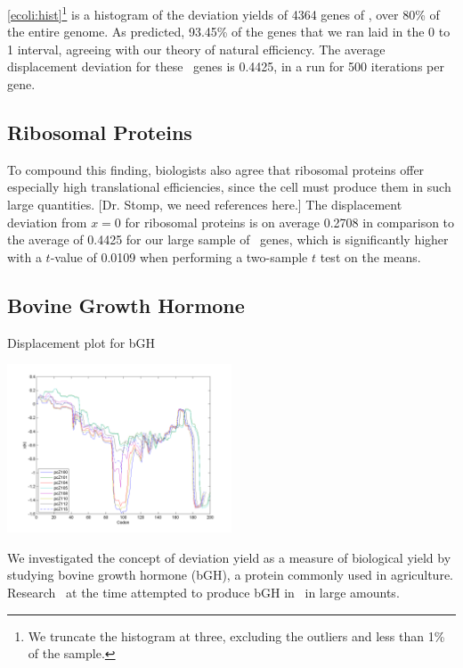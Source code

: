 \documentclass[12pt]{article}
\numberwithin{equation}{section}
\begin{document}
\autoref{ecoli:hist}\footnote{We truncate the histogram at three, excluding
  the outliers and less than 1\% of the sample.} is a histogram of the
deviation yields of 4364 genes of \ecoli, over 80\% of the entire
genome.  As predicted, 93.45\% of the genes that we ran laid in the 0
to 1 interval, agreeing with our theory of natural efficiency.  The
average displacement deviation for these \ecoli\ genes is 0.4425, in a
run for 500 iterations per gene.

\subsection{Ribosomal Proteins}
\label{section:riboproteins}
To compound this finding, biologists also agree that ribosomal
proteins offer especially high translational efficiencies, since the
cell must produce them in such large quantities. [Dr. Stomp, we need
  references here.] The displacement deviation from $x=0$ for ribosomal proteins
is on average 0.2708 in comparison to the average of 0.4425 for our
large sample of \ecoli\ genes, which is significantly higher with a $t$-value of
0.0109 when performing a two-sample $t$ test on the means.

\subsection{Bovine Growth Hormone}
\label{section:bgh}

\begin{cfigure}
  \caption{Displacement plot for bGH}
  \label{bgh:disp}
  \includegraphics[width=0.5\textwidth]{bgh/all}
\end{cfigure}

We investigated the concept of deviation yield as a measure of biological
yield by studying bovine growth hormone (bGH), a protein commonly used
in agriculture.
Research~\cite{schoner:bgh} at the time attempted to produce bGH
in \ecoli\ in large amounts.


\end{document}
